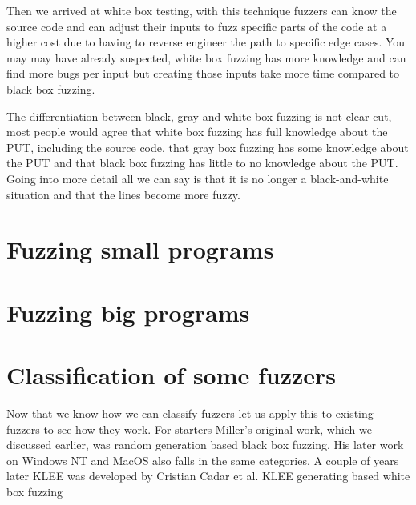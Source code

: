 Then we arrived at white box testing, with this technique fuzzers can know the source code and can adjust their inputs to fuzz specific parts of the code at a higher cost due to having to reverse engineer the path to specific edge cases. You may may have already suspected, white box fuzzing has more knowledge and can find more bugs per input but creating those inputs take more time compared to black box fuzzing.

The differentiation between black, gray and white box fuzzing is not clear cut, most people would agree that white box fuzzing has full knowledge about the PUT, including the source code, that gray box fuzzing has some knowledge about the PUT and that black box fuzzing has little to no knowledge about the PUT. Going into more detail all we can say is that it is no longer a black-and-white situation and that the lines become more fuzzy. 


\section{Fuzzing small programs} 
\section{Fuzzing big programs}

\section{Classification of some fuzzers}
Now that we know how we can classify fuzzers let us apply this to existing fuzzers to see how they work. For starters Miller's original work, which we discussed earlier, was random generation based black box fuzzing. His later work on Windows NT\cite{24MillerWindows} and MacOS\cite{25MillerOnMacOS}  also falls in the same categories.
A couple of years later KLEE was developed\cite{8KLEE} by Cristian Cadar et al. KLEE generating based white box fuzzing 




